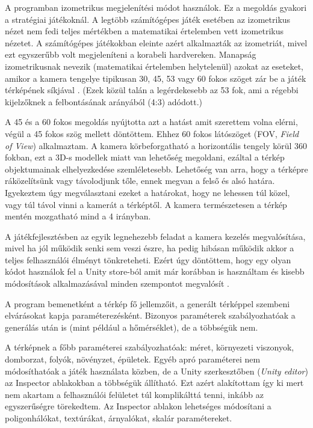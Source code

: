 A programban izometrikus megjelenítési módot használok. Ez a megoldás gyakori a stratégiai játékoknál. A legtöbb számítógépes játék esetében az izometrikus nézet nem fedi teljes mértékben a matematikai értelemben vett izometrikus nézetet. A számítógépes játékokban eleinte azért alkalmazták az izometriát, mivel ezt egyszerűbb volt megjeleníteni a korabeli hardvereken. Manapság  izometrikusnak nevezik (matematikai értelemben helytelenül) azokat az eseteket, amikor a kamera tengelye tipikusan 30, 45, 53 vagy 60 fokos szöget zár be a játék térképének síkjával \cite{Isometic}. (Ezek közül talán a legérdekesebb az 53 fok, ami a régebbi kijelzőknek a felbontásának arányából (4:3) adódott.)

A 45 és a 60 fokos megoldás nyújtotta azt a hatást amit szerettem volna elérni, végül a 45 fokos szög mellett döntöttem. Ehhez 60 fokos látószöget (FOV, \textit{Field of View}) alkalmaztam. A kamera körbeforgatható a horizontális tengely körül 360 fokban, ezt a 3D-s modellek miatt van lehetőség megoldani, ezáltal a térkép objektumainak elhelyezkedése szemléletesebb. Lehetőség van arra, hogy a térképre ráközelítsünk vagy távolodjunk tőle, ennek megvan a felső és alsó határa. Igyekeztem úgy megválasztani ezeket a határokat, hogy ne lehessen túl közel, vagy túl távol vinni a kamerát a térképtől. A kamera természetesen a térkép mentén mozgatható mind a 4 irányban. 

A játékfejlesztésben az egyik legnehezebb feladat a kamera kezelés megvalósítása, mivel ha jól működik senki sem veszi észre, ha pedig hibásan működik akkor a teljes felhasználói élményt tönkreteheti. Ezért úgy döntöttem, hogy egy olyan kódot használok fel a Unity store-ból amit már korábban is használtam és kisebb módosítások alkalmazásával minden szempontot megvalósít \cite{RTS_Camera}.


A program bemenetként a térkép fő jellemzőit, a generált térképpel szembeni elvárásokat kapja paraméterezésként. Bizonyos paraméterek szabályozhatóak a generálás után is (mint például a hőmérséklet), de a többségük nem.

A térképnek a főbb paraméterei szabályozhatóak: méret, környezeti viszonyok, domborzat, folyók, növényzet, épületek. Egyéb apró paraméterei nem módosíthatóak a játék használata közben, de a Unity szerkesztőben (\textit{Unity editor}) az Inspector ablakokban a többségük állítható. Ezt azért alakítottam így ki mert nem akartam a felhasználói felületet túl komplikálttá tenni, inkább az egyszerűségre törekedtem. Az Inspector ablakon lehetséges módosítani a poligonhálókat, textúrákat, árnyalókat, skalár paramétereket.

